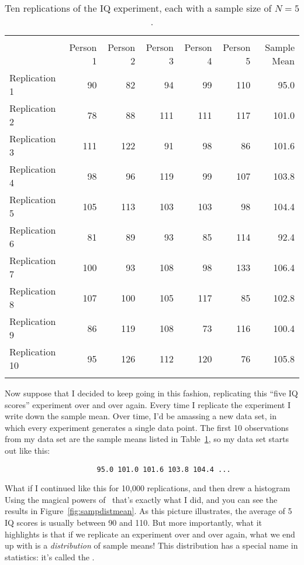 \begin{table}[t]
\centering
\caption{Ten replications of the IQ experiment, each with a sample size of $N=5$.}
\label{tab:replications}
\begin{tabular}{l|rrrrr|r}
 \multicolumn{6}{c}{} \\
 & Person 1 & Person 2 & Person 3 & Person 4 & Person 5 & Sample Mean \\ 
  \hline
Replication 1 & 90 & 82 & 94 & 99 & 110 & 95.0 \\ 
  Replication 2 & 78 & 88 & 111 & 111 & 117 & 101.0 \\ 
  Replication 3 & 111 & 122 & 91 & 98 & 86 & 101.6 \\ 
  Replication 4 & 98 & 96 & 119 & 99 & 107 & 103.8 \\ 
  Replication 5 & 105 & 113 & 103 & 103 & 98 & 104.4 \\ 
  Replication 6 & 81 & 89 & 93 & 85 & 114 & 92.4 \\ 
  Replication 7 & 100 & 93 & 108 & 98 & 133 & 106.4 \\ 
  Replication 8 & 107 & 100 & 105 & 117 & 85 & 102.8 \\ 
  Replication 9 & 86 & 119 & 108 & 73 & 116 & 100.4 \\ 
  Replication 10 & 95 & 126 & 112 & 120 & 76 & 105.8 \\ 
  \multicolumn{6}{c}{} \\
\end{tabular}
\HR
\end{table}

Now suppose that I decided to keep going in this fashion, replicating this ``five IQ scores'' experiment over and over again. Every time I replicate the experiment I write down the sample mean. Over time, I'd be amassing a new data set, in which every experiment generates a single data point. The first 10 observations from my data set are the sample means listed in Table~\ref{tab:replications}, so my data set starts out like this:
\begin{verbatim}
                      95.0 101.0 101.6 103.8 104.4 ...
\end{verbatim}
What if I continued like this for 10,000 replications, and then drew a histogram Using the magical powers of \R\ that's exactly what I did, and you can see the results in Figure~\ref{fig:sampdistmean}. As this picture illustrates, the average of 5 IQ scores is usually between 90 and 110. But more importantly, what it highlights is that if we replicate an experiment over and over again, what we end up with is a {\it distribution} of sample means! This distribution has a special name in statistics: it's called the . 

